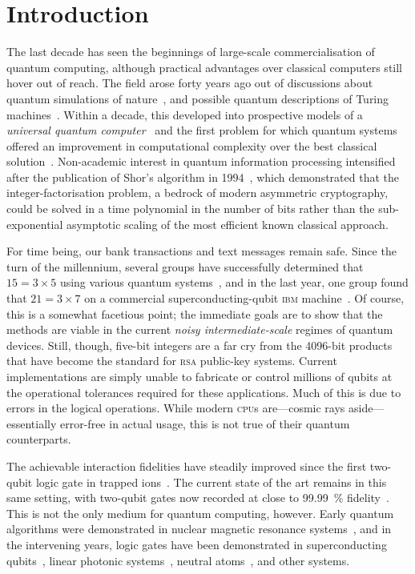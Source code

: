 \chapter{Introduction}

The last decade has seen the beginnings of large-scale commercialisation of quantum computing, although practical advantages over classical computers still hover out of reach.
The field arose forty years ago out of discussions about quantum simulations of nature~\cite{Feynman1982}, and possible quantum descriptions of Turing machines~\cite{Benioff1980,Benioff1982}.
Within a decade, this developed into prospective models of a \emph{universal quantum computer}~\cite{Deutsch1985} and the first problem for which quantum systems offered an improvement in computational complexity over the best classical solution~\cite{Deutsch1989}.
Non-academic interest in quantum information processing intensified after the publication of Shor's algorithm in 1994~\cite{Shor1994}, which demonstrated that the integer-factorisation problem, a bedrock of modern asymmetric cryptography, could be solved in a time polynomial in the number of bits rather than the sub-exponential asymptotic scaling of the most efficient known classical approach.

For time being, our bank transactions and text messages remain safe.
Since the turn of the millennium, several groups have successfully determined that $15 = 3\times5$ using various quantum systems~\cite{Vandersypen2001,Lanyon2007,Lu2007}, and in the last year, one group found that $21 = 3\times7$ on a commercial superconducting-qubit \textsc{ibm} machine~\cite{Skosana2021}.
Of course, this is a somewhat facetious point; the immediate goals are to show that the methods are viable in the current \emph{noisy intermediate-scale} regimes of quantum devices.
Still, though, five-bit integers are a far cry from the \num{4096}-bit products that have become the standard for \textsc{rsa} public-key systems.
Current implementations are simply unable to fabricate or control millions of qubits at the operational tolerances required for these applications.
Much of this is due to errors in the logical operations.
While modern \textsc{cpu}s are---cosmic rays aside---essentially error-free in actual usage, this is not true of their quantum counterparts.

The achievable interaction fidelities have steadily improved since the first two-qubit logic gate in trapped ions~\cite{Monroe1995}.
The current state of the art remains in this same setting, with two-qubit gates now recorded at close to \qty{99.99}{\percent} fidelity~\cite{Ballance2016,Gaebler2016}.
This is not the only medium for quantum computing, however.
Early quantum algorithms were demonstrated in nuclear magnetic resonance systems~\cite{Chuang1998,Jones1998}, and in the intervening years, logic gates have been demonstrated in superconducting qubits~\cite{Wendin2017}, linear photonic systems~\cite{Kok2007}, neutral atoms~\cite{Bluvstein2022}, and other systems.

